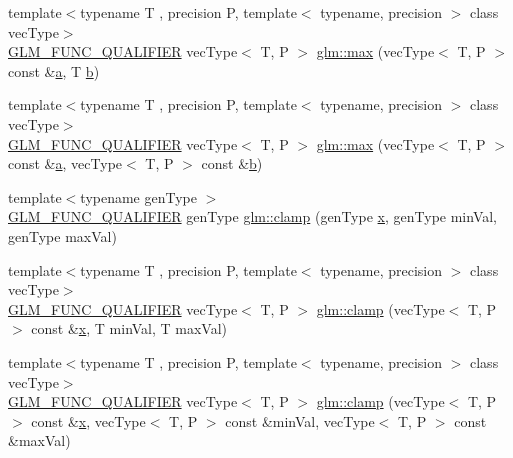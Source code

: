 \begin{DoxyCompactItemize}
\item 
{\footnotesize template$<$typename T , precision P, template$<$ typename, precision $>$ class vec\+Type$>$ }\\\mbox{\hyperlink{setup_8hpp_a33fdea6f91c5f834105f7415e2a64407}{G\+L\+M\+\_\+\+F\+U\+N\+C\+\_\+\+Q\+U\+A\+L\+I\+F\+I\+ER}} vec\+Type$<$ T, P $>$ \mbox{\hyperlink{group__core__func__common_ga1a31d3f13a4bd0aa9828e263b7ac5896}{glm\+::max}} (vec\+Type$<$ T, P $>$ const \&\mbox{\hyperlink{glad_8h_ac8729153468b5dcf13f971b21d84d4e5}{a}}, T \mbox{\hyperlink{glad_8h_a6eba317e3cf44d6d26c04a5a8f197dcb}{b}})
\item 
{\footnotesize template$<$typename T , precision P, template$<$ typename, precision $>$ class vec\+Type$>$ }\\\mbox{\hyperlink{setup_8hpp_a33fdea6f91c5f834105f7415e2a64407}{G\+L\+M\+\_\+\+F\+U\+N\+C\+\_\+\+Q\+U\+A\+L\+I\+F\+I\+ER}} vec\+Type$<$ T, P $>$ \mbox{\hyperlink{group__core__func__common_gad2ac6877ac7872a402ef5cae9bc6a30b}{glm\+::max}} (vec\+Type$<$ T, P $>$ const \&\mbox{\hyperlink{glad_8h_ac8729153468b5dcf13f971b21d84d4e5}{a}}, vec\+Type$<$ T, P $>$ const \&\mbox{\hyperlink{glad_8h_a6eba317e3cf44d6d26c04a5a8f197dcb}{b}})
\item 
{\footnotesize template$<$typename gen\+Type $>$ }\\\mbox{\hyperlink{setup_8hpp_a33fdea6f91c5f834105f7415e2a64407}{G\+L\+M\+\_\+\+F\+U\+N\+C\+\_\+\+Q\+U\+A\+L\+I\+F\+I\+ER}} gen\+Type \mbox{\hyperlink{group__core__func__common_ga93bce26c7d80d30a62f5c508f8498a6c}{glm\+::clamp}} (gen\+Type \mbox{\hyperlink{glad_8h_a92d0386e5c19fb81ea88c9f99644ab1d}{x}}, gen\+Type min\+Val, gen\+Type max\+Val)
\item 
{\footnotesize template$<$typename T , precision P, template$<$ typename, precision $>$ class vec\+Type$>$ }\\\mbox{\hyperlink{setup_8hpp_a33fdea6f91c5f834105f7415e2a64407}{G\+L\+M\+\_\+\+F\+U\+N\+C\+\_\+\+Q\+U\+A\+L\+I\+F\+I\+ER}} vec\+Type$<$ T, P $>$ \mbox{\hyperlink{group__core__func__common_gaf9deddb167a3055ca51cd9af3ce535f6}{glm\+::clamp}} (vec\+Type$<$ T, P $>$ const \&\mbox{\hyperlink{glad_8h_a92d0386e5c19fb81ea88c9f99644ab1d}{x}}, T min\+Val, T max\+Val)
\item 
{\footnotesize template$<$typename T , precision P, template$<$ typename, precision $>$ class vec\+Type$>$ }\\\mbox{\hyperlink{setup_8hpp_a33fdea6f91c5f834105f7415e2a64407}{G\+L\+M\+\_\+\+F\+U\+N\+C\+\_\+\+Q\+U\+A\+L\+I\+F\+I\+ER}} vec\+Type$<$ T, P $>$ \mbox{\hyperlink{group__core__func__common_ga240b9ec68274f12a2c4b6debf8979d1c}{glm\+::clamp}} (vec\+Type$<$ T, P $>$ const \&\mbox{\hyperlink{glad_8h_a92d0386e5c19fb81ea88c9f99644ab1d}{x}}, vec\+Type$<$ T, P $>$ const \&min\+Val, vec\+Type$<$ T, P $>$ const \&max\+Val)

\end{DoxyCompactItemize}

